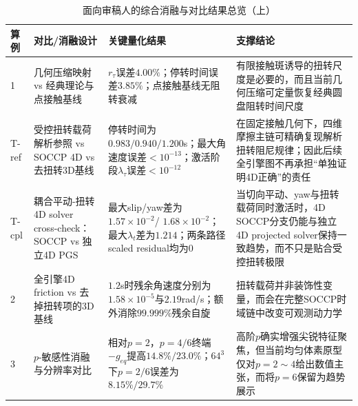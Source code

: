 ﻿\documentclass[12pt, a4paper]{ctexart}
\theoremstyle{plain}
\theoremstyle{remark}
\begin{document}
\begin{table}[htbp]
    \centering
    \caption{面向审稿人的综合消融与对比结果总览（上）}
    \label{tab:reviewer_summary_a}
    \scriptsize
    \setlength{\tabcolsep}{4pt}
    \renewcommand{\arraystretch}{1.05}
    \begin{tabular}{p{1.0cm}p{3.0cm}p{4.4cm}p{5.0cm}}
        \toprule
        算例 & 对比/消融设计 & 关键量化结果 & 支撑结论 \\
        \midrule
        1 & 几何压缩映射 vs 经典理论与点接触基线 & $r_{\tau}$误差$4.00\%$；停转时间误差$3.85\%$；点接触基线无阻转衰减 & 有限接触斑诱导的扭转尺度是必要的，而且当前几何压缩可定量恢复经典圆盘阻转时间尺度 \\
        T-ref & 受控扭转载荷解析参照 vs SOCCP 4D vs 去扭转3D基线 & 停转时间为$0.983/0.940/1.200$s；最大角速度误差$<10^{-13}$；激活阶段$\lambda_{\tau}$误差$<10^{-12}$ & 在固定接触几何下，四维摩擦主链可精确复现解析扭转阻尼规律；因此后续全引擎图不再承担``单独证明4D正确''的责任 \\
        T-cpl & 耦合平动-扭转4D solver cross-check：SOCCP vs 独立4D PGS & 最大slip/yaw差为$1.57\times10^{-2}$/ $1.68\times10^{-2}$；最大$\lambda_t$差为$1.214$；两条路径scaled residual均为$0$ & 当切向平动、yaw与扭转载荷同时激活时，4D SOCCP分支仍能与独立4D projected solver保持一致趋势，而不只是贴合受控扭转极限 \\
        2 & 全引擎4D friction vs 去掉扭转项的3D基线 & $1.2$s时残余角速度分别为$1.58\times10^{-5}$与$2.19$rad/s；额外消除$99.999\%$残余自旋 & 扭转载荷并非装饰性变量，而会在完整SOCCP时域链中改变可观测动力学 \\
        3 & $p$-敏感性消融与分辨率对比 & 相对$p=2$，$p=4/6$终端$-g_{eq}$提高$14.8\%/23.0\%$；$64^3$下$p=2/6$误差为$8.15\%/29.7\%$ & 高阶$p$确实增强尖锐特征聚焦，但当前均匀体素原型仅对$p=2\sim4$给出数值主张，而将$p=6$保留为趋势展示 \\
        \bottomrule
    \end{tabular}
\end{table}
\end{document}
